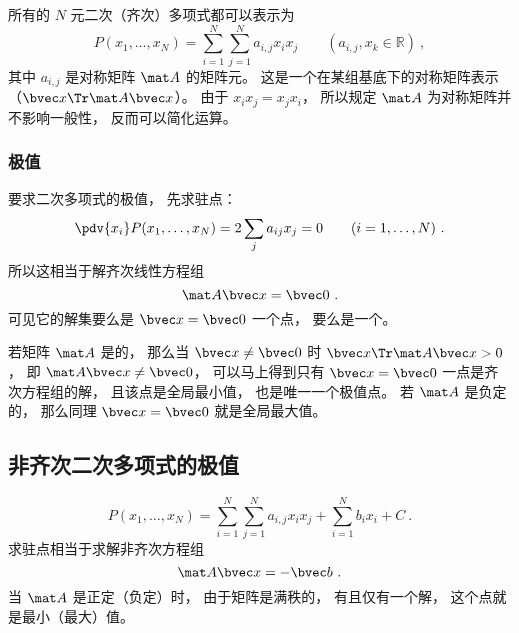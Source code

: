 

所有的 $N$ 元二次（齐次）多项式都可以表示为
\begin{equation}
P(x_1,\dots,x_N) = \sum_{i=1}^N\sum_{j=1}^N a_{i,j}x_i x_j \qquad (a_{i,j}, x_k \in \mathbb R)~,
\end{equation}
其中 $a_{i,j}$ 是对称矩阵 $\mat A$ 的矩阵元。 这是一个在某组基底下的对称矩阵表示（$\bvec x\Tr \mat A \bvec x$）。 由于 $x_i x_j = x_j x_i$， 所以规定 $\mat A$ 为对称矩阵并不影响一般性， 反而可以简化运算。

\subsubsection{极值}
要求二次多项式的极值， 先求驻点：
\begin{equation}
\pdv{x_i}P(x_1,\dots,x_N) = 2\sum_j a_{ij} x_j = 0 \qquad (i = 1,\dots,N)~.
\end{equation}
所以这相当于解齐次线性方程组
\begin{equation}
\mat A \bvec x = \bvec 0~.
\end{equation}
可见它的解集要么是 $\bvec x = \bvec 0$ 一个点， 要么是一个。

若矩阵 $\mat A$ 是的， 那么当 $\bvec x \ne \bvec 0$ 时 $\bvec x\Tr \mat A \bvec x > 0$， 即 $\mat A \bvec x \ne \bvec 0$， 可以马上得到只有 $\bvec x = \bvec 0$ 一点是齐次方程组的解， 且该点是全局最小值， 也是唯一一个极值点。 若 $\mat A$ 是负定的， 那么同理 $\bvec x = \bvec 0$ 就是全局最大值。

\subsection{非齐次二次多项式的极值}
\begin{equation}
P(x_1,\dots,x_N) = \sum_{i=1}^N\sum_{j=1}^N a_{i,j}x_i x_j + \sum_{i=1}^N b_i x_i + C~.
\end{equation}
求驻点相当于求解非齐次方程组
\begin{equation}
\mat A \bvec x = -\bvec b~.
\end{equation}
当 $\mat A$ 是正定（负定）时， 由于矩阵是满秩的， 有且仅有一个解， 这个点就是最小（最大）值。
